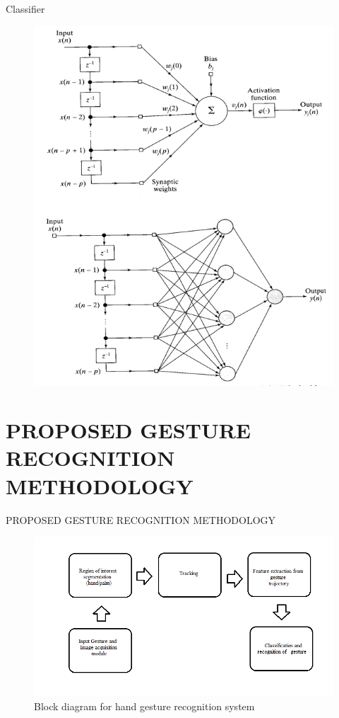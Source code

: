 \documentclass{beamer}
\begin{document}
\begin{frame}{Classifier}
\begin{figure}
\begin{center}
\includegraphics[scale=0.3]{Picture1.png}
\end{center}
\end{figure}
\end{frame}

\section{PROPOSED GESTURE RECOGNITION
METHODOLOGY}
\begin{frame}{PROPOSED GESTURE RECOGNITION
METHODOLOGY}

\begin{figure}
  \begin{center}
  \includegraphics[scale=0.55]{images/modues.png}
  \caption{Block diagram for hand gesture recognition system }
  \end{center}
  \end{figure}

\end{frame}
\end{document}

